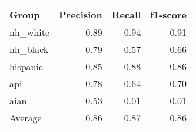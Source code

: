\begin{tabular}{lrrr}
    \toprule
    Group     & Precision & Recall & f1-score \\
    \midrule
    nh\_white & 0.89      & 0.94   & 0.91     \\
    nh\_black & 0.79      & 0.57   & 0.66     \\
    hispanic  & 0.85      & 0.88   & 0.86     \\
    api       & 0.78      & 0.64   & 0.70     \\
    aian      & 0.53      & 0.01   & 0.01     \\
    \midrule
    Average   & 0.86      & 0.87   & 0.86     \\
    \bottomrule
\end{tabular}
